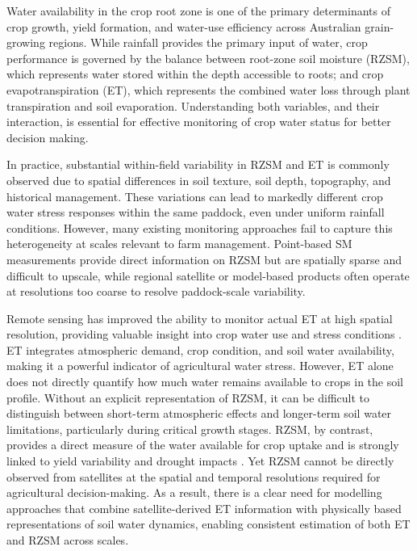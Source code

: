 \documentclass[11pt,a4paper]{article}
\begin{document}
Water availability in the crop root zone is one of the primary determinants of crop growth, yield formation, and water-use efficiency across Australian grain-growing regions. While rainfall provides the primary input of water, crop performance is governed by the balance between root-zone soil moisture (RZSM), which represents water stored within the depth accessible to roots; and crop evapotranspiration (ET), which represents the combined water loss through plant transpiration and soil evaporation. Understanding both variables, and their interaction, is essential for effective monitoring of crop water status for better decision making.

In practice, substantial within-field variability in RZSM and ET is commonly observed due to spatial differences in soil texture, soil depth, topography, and historical management. These variations can lead to markedly different crop water stress responses within the same paddock, even under uniform rainfall conditions. However, many existing monitoring approaches fail to capture this heterogeneity at scales relevant to farm management. Point-based SM measurements provide direct information on RZSM but are spatially sparse and difficult to upscale, while regional satellite or model-based products often operate at resolutions too coarse to resolve paddock-scale variability.

Remote sensing has improved the ability to monitor actual ET at high spatial resolution, providing valuable insight into crop water use and stress conditions \citep{anderson_use_2012,senay_operational_2013}. ET integrates atmospheric demand, crop condition, and soil water availability, making it a powerful indicator of agricultural water stress. However, ET alone does not directly quantify how much water remains available to crops in the soil profile. Without an explicit representation of RZSM, it can be difficult to distinguish between short-term atmospheric effects and longer-term soil water limitations, particularly during critical growth stages. RZSM, by contrast, provides a direct measure of the water available for crop uptake and is strongly linked to yield variability and drought impacts \citep{mcnally_land_2017,seneviratne_investigating_2010}. Yet RZSM cannot be directly observed from satellites at the spatial and temporal resolutions required for agricultural decision-making. As a result, there is a clear need for modelling approaches that combine satellite-derived ET information with physically based representations of soil water dynamics, enabling consistent estimation of both ET and RZSM across scales.
\end{document}
